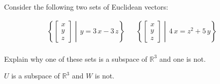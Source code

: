 
\begin{exerciseStatement}


Consider the following two sets of Euclidean vectors: 


\begin{align*}  \left\{ \left[\begin{array}{c}
x \\
y \\
z
\end{array}\right] \middle|\,y = 3 \, x - 3 \, z\right\}  & &   \left\{ \left[\begin{array}{c}
x \\
y \\
z
\end{array}\right] \middle|\,4 \, x = z^{2} + 5 \, y\right\}  \\ \end{align*}
            

 Explain why one of these sets is a subspace of \(\mathbb{R}^ 3 \) and one is not. 


\end{exerciseStatement}
    
\begin{exerciseAnswer} 


\(U\) is a subspace of \(\mathbb{R}^ 3 \) and \(W\) is not.


\end{exerciseAnswer}
    
